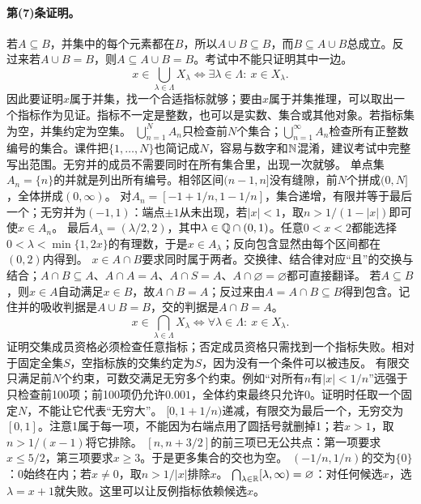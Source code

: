 \paragraph{第(7)条证明。}若$A\subseteq B$，并集中的每个元素都在$B$，所以$A\cup B\subseteq B$，而$B\subseteq A\cup B$总成立。反过来若$A\cup B=B$，则$A\subseteq A\cup B=B$。考试中不能只证明其中一边。
\[x\in\bigcup_{\lambda\in\Lambda}X_\lambda\iff\exists\lambda\in\Lambda:\ x\in X_\lambda.\]
因此要证明$x$属于并集，找一个合适指标就够；要由$x$属于并集推理，可以取出一个指标作为见证。指标不一定是整数，也可以是实数、集合或其他对象。若指标集为空，并集约定为空集。
$\bigcup_{n=1}^N A_n$只检查前$N$个集合；$\bigcup_{n=1}^{\infty}A_n$检查所有正整数编号的集合。课件把$\{1,\ldots,N\}$也简记成$N$，容易与数字和$\mathbb{N}$混淆，建议考试中完整写出范围。无穷并的成员不需要同时在所有集合里，出现一次就够。
单点集$A_n=\{n\}$的并就是列出所有编号。相邻区间$(n-1,n]$没有缝隙，前$N$个拼成$(0,N]$，全体拼成$(0,\infty)$。
对$A_n=[-1+1/n,1-1/n]$，集合递增，有限并等于最后一个；无穷并为$(-1,1)$：端点$\pm1$从未出现，若$|x|<1$，取$n>1/(1-|x|)$即可使$x\in A_n$。
最后$A_\lambda=(\lambda/2,2)$，其中$\lambda\in\mathbb{Q}\cap(0,1)$。任意$0<x<2$都能选择$0<\lambda<\min\{1,2x\}$的有理数，于是$x\in A_\lambda$；反向包含显然由每个区间都在$(0,2)$内得到。
$x\in A\cap B$要求同时属于两者。交换律、结合律对应“且”的交换与结合；$A\cap B\subseteq A$、$A\cap A=A$、$A\cap S=A$、$A\cap\varnothing=\varnothing$都可直接翻译。
若$A\subseteq B$，则$x\in A$自动满足$x\in B$，故$A\cap B=A$；反过来由$A=A\cap B\subseteq B$得到包含。记住并的吸收判据是$A\cup B=B$，交的判据是$A\cap B=A$。
\[x\in\bigcap_{\lambda\in\Lambda}X_\lambda\iff\forall\lambda\in\Lambda:\ x\in X_\lambda.\]
证明交集成员资格必须检查任意指标；否定成员资格只需找到一个指标失败。相对于固定全集$S$，空指标族的交集约定为$S$，因为没有一个条件可以被违反。
有限交只满足前$N$个约束，可数交满足无穷多个约束。例如“对所有$n$有$|x|<1/n$”远强于只检查前100项；前100项仍允许$0.001$，全体约束最终只允许0。证明时任取一个固定$N$，不能让它代表“无穷大”。
$[0,1+1/n)$递减，有限交为最后一个，无穷交为$[0,1]$。注意1属于每一项，不能因为右端点用了圆括号就删掉1；若$x>1$，取$n>1/(x-1)$将它排除。
$[n,n+3/2]$的前三项已无公共点：第一项要求$x\le5/2$，第三项要求$x\ge3$。于是更多集合的交也为空。
$(-1/n,1/n)$的交为$\{0\}$：0始终在内；若$x\ne0$，取$n>1/|x|$排除$x$。
$\bigcap_{\lambda\in\mathbb{R}}[\lambda,\infty)=\varnothing$：对任何候选$x$，选$\lambda=x+1$就失败。这里可以让反例指标依赖候选$x$。

